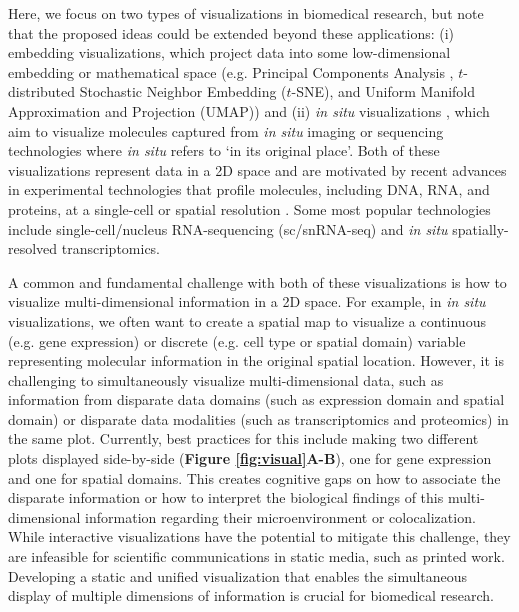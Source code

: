 \documentclass[unnumsec,webpdf,modern,large,namedate]{oup-authoring-template}%
\theoremstyle{thmstyleone}%
\theoremstyle{thmstyletwo}%
\theoremstyle{thmstylethree}%
\begin{document}
Here, we focus on two types of visualizations in biomedical research, but note that the proposed ideas could be extended beyond these applications: (i) embedding visualizations, which project data into some low-dimensional embedding or mathematical space (e.g. Principal Components Analysis , $t$-distributed Stochastic Neighbor Embedding ($t$-SNE), and Uniform Manifold Approximation and Projection (UMAP)) and (ii) \textit{in situ} visualizations \citep{dries_2021}, which aim to visualize molecules captured from \textit{in situ} imaging or sequencing technologies where \textit{in situ} refers to `in its original place'. Both of these visualizations represent data in a 2D space and are motivated by recent advances in experimental technologies that profile molecules, including DNA, RNA, and proteins, at a single-cell or spatial resolution%
. Some most popular technologies include single-cell/nucleus RNA-sequencing (sc/snRNA-seq)
and \textit{in situ} spatially-resolved transcriptomics. \citep{vandereyken2023methods} 
% 

A common and fundamental challenge with both of these visualizations is how to visualize multi-dimensional information in a 2D space. For example, in \textit{in situ} visualizations, we often want to create a spatial map to visualize a continuous (e.g. gene expression) or discrete (e.g. cell type or spatial domain) variable representing molecular information in the original spatial location. However, it is challenging to simultaneously visualize multi-dimensional data, such as information from disparate data domains (such as expression domain and spatial domain) or disparate data modalities (such as transcriptomics and proteomics) in the same plot. Currently, best practices for this include making two different plots displayed side-by-side (\textbf{Figure \textbf{\ref{fig:visual}A-B}}), one for gene expression and one for spatial domains. This creates cognitive gaps on how to associate the disparate information or how to interpret the biological findings of this multi-dimensional information regarding their microenvironment or colocalization. While interactive visualizations \citep{keller_2021, pardo_2022, sriworarat_2023} have the potential to mitigate this challenge, they are infeasible for scientific communications in static media, such as printed work. Developing a static and unified visualization that enables the simultaneous display of multiple dimensions of information is crucial for biomedical research.
\end{document}
